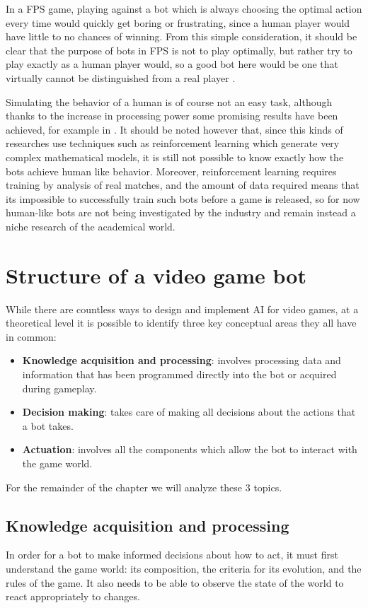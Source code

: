 In a FPS game, playing against a bot which is always choosing the optimal action every time would quickly get boring or frustrating, since a human player would have little to no chances of winning. From this simple consideration, it should be clear that the purpose of bots in FPS is not to play optimally, but rather try to play exactly as a human player would, so a good bot here would be one that virtually cannot be distinguished from a real player \cite{fun_human_bots}.

Simulating the behavior of a human is of course not an easy task, although thanks to the increase in processing power some promising results have been achieved, for example in \cite{ai_reinforcement_learning}. 
It should be noted however that, since this kinds of researches use techniques such as reinforcement learning which generate very complex mathematical models, it is still not possible to know exactly how the bots achieve human like behavior. Moreover, reinforcement learning requires training by analysis of real matches, and the amount of data required means that its impossible to successfully train such bots before a game is released, so for now human-like bots are not being investigated by the industry and remain instead a niche research of the academical world.

\section{Structure of a video game bot} \label{section:bot_theory}
While there are countless ways to design and implement AI for video games, at a theoretical level it is possible to identify three key conceptual areas they all have in common:
\begin{itemize}
\item \textbf{Knowledge acquisition and processing}: involves processing data and information that has been programmed directly into the bot or acquired during gameplay.
\item \textbf{Decision making}: takes care of making all decisions about the actions that a bot takes.
\item \textbf{Actuation}: involves all the components which allow the bot to interact with the game world.
\end{itemize}

For the remainder of the chapter we will analyze these 3 topics.

\subsection{Knowledge acquisition and processing}
In order for a bot to make informed decisions about how to act, it must first understand the game world: its composition, the criteria for its evolution, and the rules of the game. It also needs to be able to observe the state of the world to react appropriately to changes.

